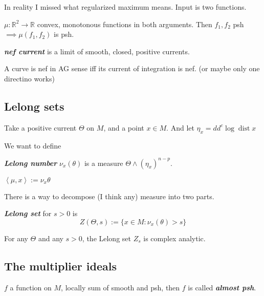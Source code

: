 In reality I missed what regularized maximum means. Input is two functions.

\begin{remark}\leavevmode
\(\mu:\mathbb{R}^2 \to \mathbb{R}\) convex, monotonous functions in both arguments. Then \(f_1,f_2\) psh \(\implies  \mu(f_1,f_2)\) is psh.
\end{remark}

\begin{defn}\leavevmode
\textit{\textbf{nef current}} is a limit of smooth, closed, positive currents.
\end{defn}

\begin{remark}\leavevmode
A curve is nef in AG sense iff its current of integration is nef. (or maybe only one directino works)
\end{remark}

\subsection{Lelong sets}

Take a positive current \(\Theta\) on \(M\), and a point \(x \in M\). And let \(\eta_x=dd^c \operatorname{log}\operatorname{dist}x\)

We want to define

\begin{defn}\leavevmode
\textit{\textbf{Lelong number}} \(\nu_x(\theta)\) is a measure \(\Theta \wedge (\eta_x)^{n-p}\).

\(\left<\mu,x\right>:= \nu_x\theta\)
\end{defn}

There is a way to decompose (I think any) measure into two parts.

\begin{defn}\leavevmode
\textit{\textbf{Lelong set}} for \(s>0\) is  
\[Z( \Theta,s):=\{x \in M : \nu_x(\theta)>s\}\]

\end{defn}

\begin{thm}[Y.T. Siu, 1974]\leavevmode
For any \(\Theta\) and any \(s>0\), the Lelong set \(Z_s\) is complex analytic.
\end{thm}

\subsection{The multiplier ideals}

\begin{defn}\leavevmode
\(f\) a function on \(M\), locally sum of smooth and psh, then \(f\) is called \textit{\textbf{almost psh}}.
\end{defn}


